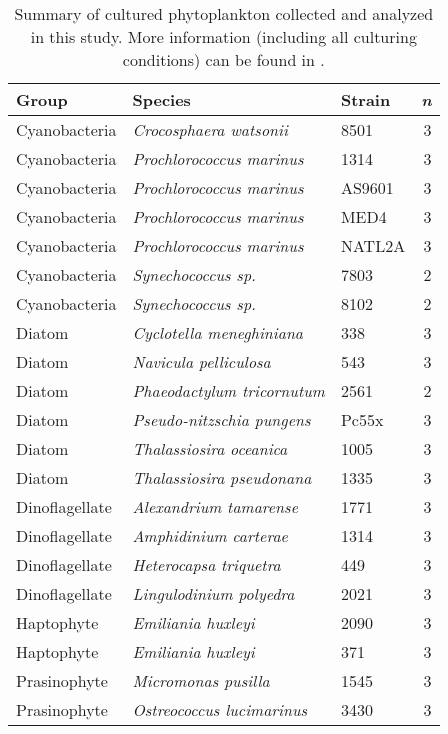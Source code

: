 \begin{table}[ht]
\centering
\begin{tabular}{lllr}
  \hline
Group & Species & Strain & \textit{n} \\ 
  \hline
Cyanobacteria & \textit{Crocosphaera watsonii} & 8501 &   3 \\ 
  Cyanobacteria & \textit{Prochlorococcus marinus} & 1314 &   3 \\ 
  Cyanobacteria & \textit{Prochlorococcus marinus} & AS9601 &   3 \\ 
  Cyanobacteria & \textit{Prochlorococcus marinus} & MED4 &   3 \\ 
  Cyanobacteria & \textit{Prochlorococcus marinus} & NATL2A &   3 \\ 
  Cyanobacteria & \textit{Synechococcus sp.} & 7803 &   2 \\ 
  Cyanobacteria & \textit{Synechococcus sp.} & 8102 &   2 \\ 
  Diatom & \textit{Cyclotella meneghiniana} & 338 &   3 \\ 
  Diatom & \textit{Navicula pelliculosa} & 543 &   3 \\ 
  Diatom & \textit{Phaeodactylum tricornutum} & 2561 &   2 \\ 
  Diatom & \textit{Pseudo-nitzschia pungens} & Pc55x &   3 \\ 
  Diatom & \textit{Thalassiosira oceanica} & 1005 &   3 \\ 
  Diatom & \textit{Thalassiosira pseudonana} & 1335 &   3 \\ 
  Dinoflagellate & \textit{Alexandrium tamarense} & 1771 &   3 \\ 
  Dinoflagellate & \textit{Amphidinium carterae} & 1314 &   3 \\ 
  Dinoflagellate & \textit{Heterocapsa triquetra} & 449 &   3 \\ 
  Dinoflagellate & \textit{Lingulodinium polyedra} & 2021 &   3 \\ 
  Haptophyte & \textit{Emiliania huxleyi} & 2090 &   3 \\ 
  Haptophyte & \textit{Emiliania huxleyi} & 371 &   3 \\ 
  Prasinophyte & \textit{Micromonas pusilla} & 1545 &   3 \\ 
  Prasinophyte & \textit{Ostreococcus lucimarinus} & 3430 &   3 \\ 
   \hline
\end{tabular}
\caption{\label{CultureSampleDescriptions}Summary of cultured phytoplankton collected and analyzed in this study. More information (including all culturing conditions) can be found in \cite{Durham2019}.} 
\end{table}

